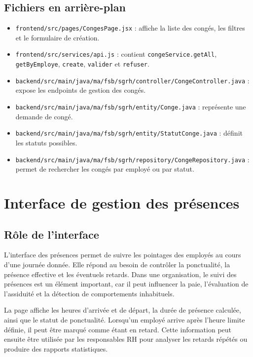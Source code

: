 \documentclass[12pt,a4paper]{report}
\begin{document}
\subsection{Fichiers en arrière-plan}

\begin{itemize}
    \item \texttt{frontend/src/pages/CongesPage.jsx} : affiche la liste des congés, les filtres et le formulaire de création.
    \item \texttt{frontend/src/services/api.js} : contient \texttt{congeService.getAll}, \texttt{getByEmploye}, \texttt{create}, \texttt{valider} et \texttt{refuser}.
    \item \texttt{backend/src/main/java/ma/fsb/sgrh/controller/CongeController.java} : expose les endpoints de gestion des congés.
    \item \texttt{backend/src/main/java/ma/fsb/sgrh/entity/Conge.java} : représente une demande de congé.
    \item \texttt{backend/src/main/java/ma/fsb/sgrh/entity/StatutConge.java} : définit les statuts possibles.
    \item \texttt{backend/src/main/java/ma/fsb/sgrh/repository/CongeRepository.java} : permet de rechercher les congés par employé ou par statut.
\end{itemize}

\section{Interface de gestion des présences}

\subsection{Rôle de l'interface}

L'interface des présences permet de suivre les pointages des employés au cours d'une journée donnée. Elle répond au besoin de contrôler la ponctualité, la présence effective et les éventuels retards. Dans une organisation, le suivi des présences est un élément important, car il peut influencer la paie, l'évaluation de l'assiduité et la détection de comportements inhabituels.

La page affiche les heures d'arrivée et de départ, la durée de présence calculée, ainsi que le statut de ponctualité. Lorsqu'un employé arrive après l'heure limite définie, il peut être marqué comme étant en retard. Cette information peut ensuite être utilisée par les responsables RH pour analyser les retards répétés ou produire des rapports statistiques.
\end{document}
